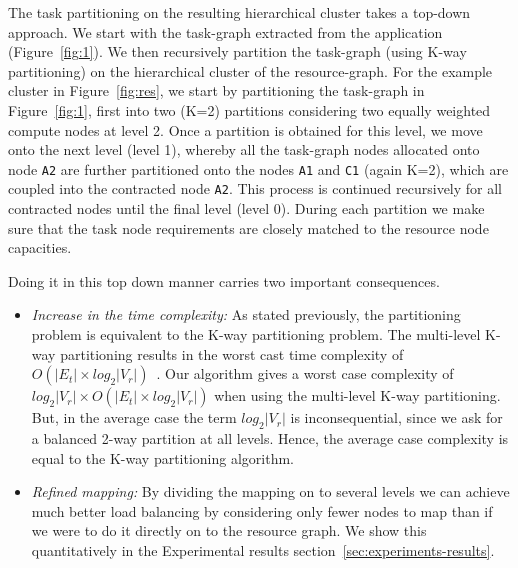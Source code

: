 The task partitioning on the resulting hierarchical cluster takes a
top-down approach. We start with the task-graph extracted from the
application (Figure~\ref{fig:1}). We then recursively partition the
task-graph (using K-way partitioning) on the hierarchical cluster of the
resource-graph. For the example cluster in Figure~\ref{fig:res}, we
start by partitioning the task-graph in Figure~\ref{fig:1}, first into
two (K=2) partitions considering two equally weighted compute nodes at
level 2. Once a partition is obtained for this level, we move onto the
next level (level 1), whereby all the task-graph nodes allocated onto
node \texttt{A2} are further partitioned onto the nodes \texttt{A1} and
\texttt{C1} (again K=2), which are coupled into the contracted node
\texttt{A2}. This process is continued recursively for all contracted
nodes until the final level (level 0). During each partition we make
sure that the task node requirements are closely matched to the resource
node capacities.


Doing it in this top down manner carries two important consequences.

\begin{itemize}

\item \textit{Increase in the time complexity:} As stated previously,
  the partitioning problem is equivalent to the K-way partitioning
  problem. The multi-level K-way partitioning results in the worst cast
  time complexity of $O(|E_t| \times log_2|V_r|)$~\cite{gkar98}. Our
  algorithm gives a worst case complexity of \mbox{$log_2|V_r| \times
    O(|E_t| \times log_2 |V_r|)$} when using the multi-level K-way
  partitioning. But, in the average case the term $log_2|V_r|$ is
  inconsequential, since we ask for a balanced 2-way partition at all
  levels. Hence, the average case complexity is equal to the K-way
  partitioning algorithm.

\item \textit{Refined mapping:} By dividing the mapping on to several
  levels we can achieve much better load balancing by considering only
  fewer nodes to map than if we were to do it directly on to the
  resource graph. We show this quantitatively in the Experimental
  results section~\ref{sec:experiments-results}.

\end{itemize}





